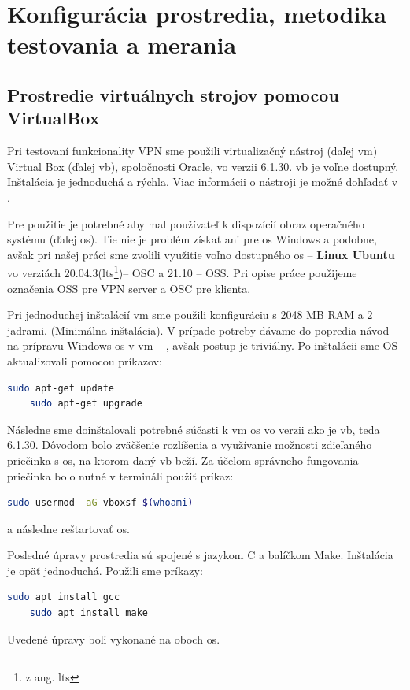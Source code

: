 \chapter{Konfigurácia prostredia, metodika testovania a merania}
\section{Prostredie virtuálnych strojov pomocou VirtualBox}\label{merania}
Pri testovaní funkcionality VPN sme použili virtualizačný nástroj (daľej \acrshort{vm}) Virtual Box (ďalej \acrshort{vb}), spoločnosti Oracle, vo verzii 6.1.30. \acrshort{vb} je voľne dostupný. Inštalácia je jednoduchá a rýchla. Viac informácii o nástroji je možné dohľadať v \cite{vbox}.

Pre použitie je potrebné aby mal používateľ k dispozícií obraz operačného systému (ďalej \acrshort{os}). Tie nie je problém získať ani pre \acrshort{os} Windows a podobne, avšak pri našej práci sme zvolili využitie voľno dostupného  \acrshort{os} -- \textbf{Linux Ubuntu} vo verziách 20.04.3(\acrshort{lts}\footnote{z ang. \acrlong{lts}})-- OSC a 21.10 -- OSS. Pri opise práce použijeme označenia OSS pre VPN server a OSC pre klienta.

Pri jednoduchej inštalácií \acrshort{vm} sme použili konfiguráciu s  2048 MB RAM a 2 jadrami. (Minimálna inštalácia). V prípade potreby dávame do popredia návod na prípravu Windows \acrshort{os} v \acrshort{vm} -- \cite{vmkonfig}, avšak postup je triviálny. Po inštalácii sme OS aktualizovali pomocou príkazov:
\begin{lstlisting}[language=bash]
	sudo apt-get update
	sudo apt-get upgrade
\end{lstlisting}
Následne sme doinštalovali potrebné súčasti k \acrshort{vm} \acrshort{os} vo verzii ako je \acrshort{vb}, teda 6.1.30. Dôvodom bolo zväčšenie rozlíšenia a využívanie možnosti zdieľaného priečinka s \acrshort{os}, na ktorom daný \acrshort{vb} beží. Za účelom správneho fungovania priečinka bolo nutné v termináli použiť príkaz:
\begin{lstlisting}[language=bash]
	sudo usermod -aG vboxsf $(whoami)
\end{lstlisting}
a následne reštartovať \acrshort{os}.

Posledné úpravy prostredia sú spojené s jazykom C a balíčkom Make. Inštalácia je opäť jednoduchá. Použili sme príkazy:
\begin{lstlisting}[language=bash]
	sudo apt install gcc
	sudo apt install make
\end{lstlisting}
Uvedené úpravy boli vykonané na oboch \acrshort{os}.

